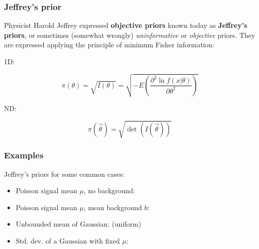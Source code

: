 \documentclass[9pt]{beamer}
\newif\ifmynote
\newif\ifmyhide
\newcommand\mynote[1]{%
\ifmynote \textbf{#1} \else \fi
}
\newcommand\myhide[1]{%
\ifmyhide \vspace{15pt} \begin{center} \myexample{(blackboard)}\end{center} \vspace{15pt} \else #1 \fi
}
\begin{document}
\begin{frame}
 \frametitle{Jeffrey's prior}
 
 Physicist Harold Jeffrey expressed \textbf{objective priors} known today as \textbf{Jeffrey's priors}, or sometimes (somewhat wrongly) \emph{uninformative} or \emph{objective} priors. 
 They are expressed applying the principle of minimum Fisher information:
 
 \myhide{1D:
 
 $$\pi(\theta) = \sqrt{I(\theta)} = \sqrt{- E\left(\frac{\partial^2 \ln f(x|\theta)}{\partial \theta^2}\right)}$$
 
 ND:
 
 $$\pi(\vec{\theta}) = \sqrt{\det (I(\vec{\theta}))}$$
}


 
\end{frame}

\begin{frame}
 \frametitle{Examples}
 
 \mynote{Write them on the blackboard too}
 
 Jeffrey's priors for some common cases:
 
 \begin{itemize}
  \item Poisson signal mean $\mu$, no background: 
  \item<2-> Poisson signal mean $\mu$, mean background $b$: 
  \item<3-> Unbounded mean of Gaussian:  (uniform)
  \item<4-> Std. dev. of a Gaussian with fixed $\mu$: 
 \end{itemize}
 

\end{frame}
\end{document}

